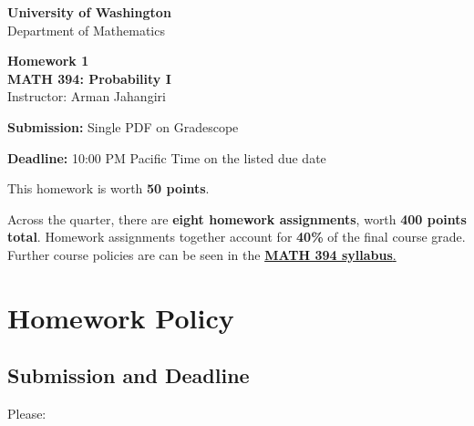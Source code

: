 \documentclass[11pt]{article}
\newcommand{\course}{MATH 394: Probability I}
\newcommand{\department}{Department of Mathematics}
\newcommand{\university}{University of Washington}
\begin{document}
\begin{titlepage}
\centering
\vspace*{1.2cm}

{\Large \textbf{\university}}\\
{\large \department}

\vspace{1.5cm}

{\Huge \color{uwpurple}\textbf{Homework 1}}\\[0.25cm]
{\Large \textbf{\course}}\\[0.25cm]
{\large Instructor: Arman Jahangiri}

\vspace{1cm}

\begin{tcolorbox}[
    width=0.78\textwidth,
    colback=softpurple,
    colframe=uwpurple,
    boxrule=0.9pt,
    arc=3mm
]
\centering

\textbf{Submission:} Single PDF on Gradescope

\textbf{Deadline:} 10:00 PM Pacific Time on the listed due date
\end{tcolorbox}

\vspace{0.8cm}

\begin{tcolorbox}[
    width=0.86\textwidth,
    colback=white,
    colframe=uwgold,
    boxrule=0.8pt,
    arc=3mm
]
This homework is worth \textbf{50 points}.

Across the quarter, there are \textbf{eight homework assignments}, worth \textbf{400 points total}. Homework assignments together account for \textbf{40\%} of the final course grade. Further course policies are can be seen in the \href{https://armanjg.github.io/MATH-394-Probability-1-v2/}{\textbf{MATH 394 syllabus}.}
\end{tcolorbox}

\vfill


\end{titlepage}

\section*{Homework Policy}

\subsection*{Submission and Deadline}

Please:
\end{document}
